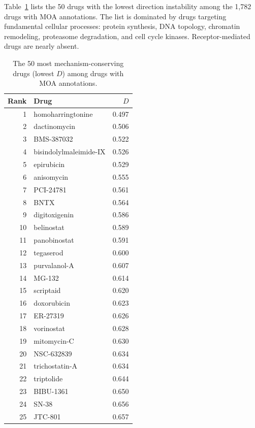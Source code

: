 \documentclass[11pt]{article}
\begin{document}
Table~\ref{tab:top50} lists the 50 drugs with the lowest direction
instability among the 1{,}782 drugs with MOA annotations. The list is
dominated by drugs targeting fundamental cellular processes: protein
synthesis, DNA topology, chromatin remodeling, proteasome degradation, and
cell cycle kinases. Receptor-mediated drugs are nearly absent.

\begin{table}[h]
\centering
\caption{The 50 most mechanism-conserving drugs (lowest $D$) among drugs
with MOA annotations.}
\label{tab:top50}
\small
\begin{minipage}[t]{0.48\textwidth}
\centering
\begin{tabular}{@{}rlr@{}}
\toprule
Rank & Drug & $D$ \\
\midrule
1 & homoharringtonine & 0.497 \\
2 & dactinomycin & 0.506 \\
3 & BMS-387032 & 0.522 \\
4 & bisindolylmaleimide-IX & 0.526 \\
5 & epirubicin & 0.529 \\
6 & anisomycin & 0.555 \\
7 & PCI-24781 & 0.561 \\
8 & BNTX & 0.564 \\
9 & digitoxigenin & 0.586 \\
10 & belinostat & 0.589 \\
11 & panobinostat & 0.591 \\
12 & tegaserod & 0.600 \\
13 & purvalanol-A & 0.607 \\
14 & MG-132 & 0.614 \\
15 & scriptaid & 0.620 \\
16 & doxorubicin & 0.623 \\
17 & ER-27319 & 0.626 \\
18 & vorinostat & 0.628 \\
19 & mitomycin-C & 0.630 \\
20 & NSC-632839 & 0.634 \\
21 & trichostatin-A & 0.634 \\
22 & triptolide & 0.644 \\
23 & BIBU-1361 & 0.650 \\
24 & SN-38 & 0.656 \\
25 & JTC-801 & 0.657 \\
\bottomrule
\end{tabular}
\end{minipage}%

\end{table}
\end{document}

